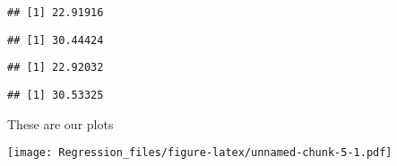 \documentclass[
]{article}
\newenvironment{Shaded}{\begin{snugshade}}{\end{snugshade}}
\newcommand{\FloatTok}[1]{\textcolor[rgb]{0.00,0.00,0.81}{#1}}
\newcommand{\FunctionTok}[1]{\textcolor[rgb]{0.00,0.00,0.00}{#1}}
\newcommand{\NormalTok}[1]{#1}
\newcommand{\SpecialCharTok}[1]{\textcolor[rgb]{0.00,0.00,0.00}{#1}}
\begin{document}
\begin{Shaded}
\end{Shaded}

\begin{verbatim}
## [1] 22.91916
\end{verbatim}

\begin{Shaded}
\end{Shaded}

\begin{verbatim}
## [1] 30.44424
\end{verbatim}

\begin{Shaded}
\end{Shaded}

\begin{verbatim}
## [1] 22.92032
\end{verbatim}

\begin{Shaded}
\end{Shaded}

\begin{verbatim}
## [1] 30.53325
\end{verbatim}

These are our plots

\begin{Shaded}
\end{Shaded}

\texttt{[image: Regression\_files/figure-latex/unnamed-chunk-5-1.pdf]}
\end{document}
